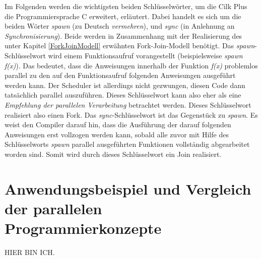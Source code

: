 			Im Folgenden werden die wichtigsten beiden Schlüsselwörter, um die Cilk Plus die Programmiersprache C erweitert, erläutert. Dabei handelt es sich um die beiden Wörter \textit{spawn} (zu Deutsch \textit{vermehren}), und \textit{sync} (in Anlehnung an \textit{Synchronisierung}). Beide werden in Zusammenhang mit der Realisierung des unter Kapitel \ref{ForkJoinModell} erwähnten Fork-Join-Modell benötigt. Das \textit{spawn}-Schlüsselwort wird einem Funktionsaufruf vorangestellt (beispielsweise \textit{spawn f(x)}). Das bedeutet, dass die Anweisungen innerhalb der Funktion \textit{f(x)} problemlos parallel zu den auf den Funktionsaufruf folgenden Anweisungen ausgeführt werden kann. Der Scheduler ist allerdings nicht gezwungen, diesen Code dann tatsächlich parallel auszuführen. Dieses Schlüsselwort kann also eher als eine \textit{Empfehlung der parallelen Verarbeitung} betrachtet werden. Dieses Schlüsselwort realisiert also einen Fork. Das \textit{sync}-Schlüsselwort ist das Gegenstück zu \textit{spawn}. Es weist den Compiler darauf hin, dass die Ausführung der darauf folgenden Anweisungen erst vollzogen werden kann, sobald alle zuvor mit Hilfe des Schlüsselworts \textit{spawn} parallel ausgeführten Funktionen vollständig abgearbeitet worden sind. Somit wird durch dieses Schlüsselwort ein Join realisiert. \cite{CilkWikipedia}
		
	\section{Anwendungsbeispiel und Vergleich der parallelen Programmierkonzepte}
	
		HIER BIN ICH.